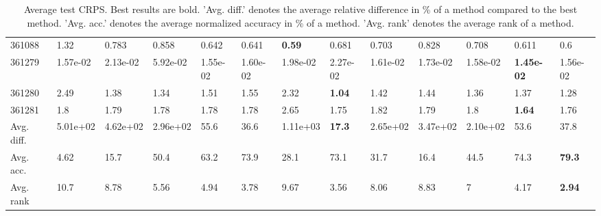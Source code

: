 \begin{table}[ht!]
\begin{tabular}{lllllllllllll}
  361088 & 1.32 & 0.783 & 0.858 & 0.642 & 0.641 & \textbf{0.59} & 0.681 & 0.703 & 0.828 & 0.708 & 0.611 & 0.6 \\ 
  361279 & 1.57e-02 & 2.13e-02 & 5.92e-02 & 1.55e-02 & 1.60e-02 & 1.98e-02 & 2.27e-02 & 1.61e-02 & 1.73e-02 & 1.58e-02 & \textbf{1.45e-02} & 1.56e-02 \\ 
  361280 & 2.49 & 1.38 & 1.34 & 1.51 & 1.55 & 2.32 & \textbf{1.04} & 1.42 & 1.44 & 1.36 & 1.37 & 1.28 \\ 
  361281 & 1.8 & 1.79 & 1.78 & 1.78 & 1.78 & 2.65 & 1.75 & 1.82 & 1.79 & 1.8 & \textbf{1.64} & 1.76 \\ 
   \hline
Avg. diff. & 5.01e+02 & 4.62e+02 & 2.96e+02 & 55.6 & 36.6 & 1.11e+03 & \textbf{17.3} & 2.65e+02 & 3.47e+02 & 2.10e+02 & 53.6 & 37.8 \\ 
  Avg. acc. & 4.62 & 15.7 & 50.4 & 63.2 & 73.9 & 28.1 & 73.1 & 31.7 & 16.4 & 44.5 & 74.3 & \textbf{79.3} \\ 
  Avg. rank & 10.7 & 8.78 & 5.56 & 4.94 & 3.78 & 9.67 & 3.56 & 8.06 & 8.83 & 7 & 4.17 & \textbf{2.94} \\ 
   \hline
\hline
\end{tabular}
\endgroup
\caption{Average test CRPS. 
                  Best results are bold. 
                  'Avg. diff.' denotes the average relative difference in \% of a method compared to the best method.
                  'Avg. acc.' denotes the average normalized accuracy in \% of a method.
                  'Avg. rank' denotes the average rank of a method.} 
\label{TABLES/table_results_CRPS_mahalanobis}
\end{table}
